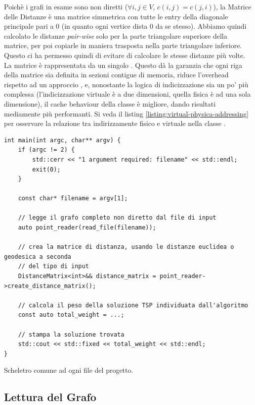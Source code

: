 \noindent Poichè i grafi in esame sono non diretti ($\forall i,j \in V$, $c(i,j) = c(j,i)$), la Matrice delle Distanze è una matrice simmetrica con tutte le entry della diagonale principale pari a 0 (in quanto ogni vertice dista 0 da se stesso).
Abbiamo quindi calcolato le distanze \textit{pair-wise} solo per la parte triangolare superiore della matrice, per poi copiarle in maniera trasposta nella parte triangolare inferiore. Questo ci ha permesso quindi di evitare di calcolare le stesse distanze più volte. \\

\noindent La matrice è rappresentata da un singolo . Questo dà la garanzia che ogni riga della matrice sia definita in sezioni contigue di memoria, riduce l'overhead rispetto ad un approccio , e, nonostante la logica di indicizzazione sia un po' più complessa (l'indicizzazione virtuale è a due dimensioni, quella fisica è ad una sola dimensione), il cache behaviour della classe è migliore, dando risultati mediamente più performanti. Si veda il listing \ref{listing:virtual-physica-addressing} per osservare la relazione tra indirizzamente fisico e virtuale nella classe .

\begin{listing}[!ht]
\begin{verbatim}
int main(int argc, char** argv) {
    if (argc != 2) {
        std::cerr << "1 argument required: filename" << std::endl;
        exit(0);
    }

    const char* filename = argv[1];

    // legge il grafo completo non diretto dal file di input
    auto point_reader(read_file(filename));

    // crea la matrice di distanza, usando le distanze euclidea o geodesica a seconda
    // del tipo di input
    DistanceMatrix<int>&& distance_matrix = point_reader->create_distance_matrix();

    // calcola il peso della soluzione TSP individuata dall'algoritmo
    const auto total_weight = ...;

    // stampa la soluzione trovata
    std::cout << std::fixed << total_weight << std::endl;
}
\end{verbatim}
\caption{Scheletro comune ad ogni file  del progetto.}
\label{listing:main-cpp}
\end{listing}

\subsection{Lettura del Grafo}

